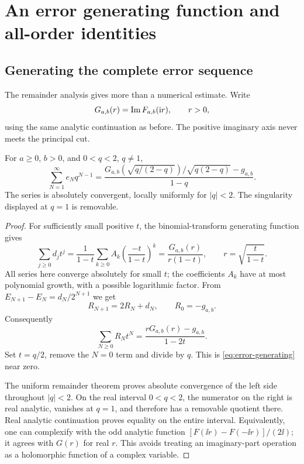 \section{An error generating function and all-order identities}
\label{sec:identities}
\subsection{Generating the complete error sequence}
The remainder analysis gives more than a numerical estimate. Write
\[
 G_{a,b}(r)=\operatorname{Im} F_{a,b}(\mathrm i r),\qquad r>0,
\]
using the same analytic continuation as before. The positive imaginary axis never meets the principal cut.

\begin{theorem}\label{thm:generating}
For $a\ge0$, $b>0$, and $0<q<2$, $q\ne1$,
\begin{equation}\label{eq:error-generating}
 \boxed{\sum_{N=1}^{\infty}e_Nq^{N-1}
 =\frac{G_{a,b}\!\left(\sqrt{q/(2-q)}\right)/\sqrt{q(2-q)}-g_{a,b}}{1-q}.}
\end{equation}
The series is absolutely convergent, locally uniformly for $|q|<2$. The singularity displayed at $q=1$ is removable.
\end{theorem}
\begin{proof}
For sufficiently small positive $t$, the binomial-transform generating function gives
\[
 \sum_{j\ge0}d_jt^j
 =\frac1{1-t}\sum_{k\ge0}A_k\left(\frac{-t}{1-t}\right)^k
 =\frac{G_{a,b}(r)}{r(1-t)},\qquad r=\sqrt{\frac{t}{1-t}}.
\]
All series here converge absolutely for small $t$; the coefficients $A_k$ have at most polynomial growth, with a possible logarithmic factor. From $E_{N+1}-E_N=d_N/2^{N+1}$ we get
\[
 R_{N+1}=2R_N+d_N,\qquad R_0=-g_{a,b}.
\]
Consequently
\begin{equation}\label{eq:scaled-generating}
 \sum_{N\ge0}R_Nt^N
 =\frac{rG_{a,b}(r)-g_{a,b}}{1-2t}.
\end{equation}
Set $t=q/2$, remove the $N=0$ term and divide by $q$. This is \eqref{eq:error-generating} near zero.

The uniform remainder theorem proves absolute convergence of the left side throughout $|q|<2$. On the real interval $0<q<2$, the numerator on the right is real analytic, vanishes at $q=1$, and therefore has a removable quotient there. Real analytic continuation proves equality on the entire interval. Equivalently, one can complexify with the odd analytic function $[F(\ii r)-F(-\ii r)]/(2\ii)$; it agrees with $G(r)$ for real $r$. This avoids treating an imaginary-part operation as a holomorphic function of a complex variable.
\end{proof}

